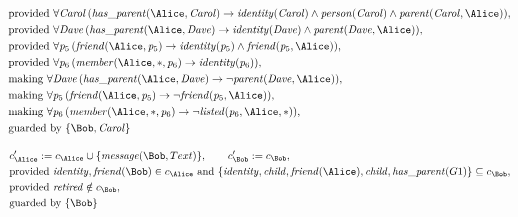 \begin{align*}
&
\text{provided } 
\forall 
\mathit{Carol}
\,(
\mathit{\detokenize{
has_parent
}}
(
\Alice
,
\mathit{Carol}
)
\rightarrow
\mathit{\detokenize{
identity
}}
(
\mathit{Carol}
)
\land
\mathit{\detokenize{
person
}}
(
\mathit{Carol}
)
\land
\mathit{\detokenize{
parent
}}
(
\mathit{Carol}
,
\Alice
)
)
,\\
&
\text{provided } 
\forall 
\mathit{Dave}
\,(
\mathit{\detokenize{
has_parent
}}
(
\Alice
,
\mathit{Dave}
)
\rightarrow
\mathit{\detokenize{
identity
}}
(
\mathit{Dave}
)
\land
\mathit{\detokenize{
parent
}}
(
\mathit{Dave}
,
\Alice
)
)
,\\
&
\text{provided } 
\forall 
\mathit{p}_{
5
}
\,(
\mathit{\detokenize{
friend
}}
(
\Alice
,
\mathit{p}_{
5
}
)
\rightarrow
\mathit{\detokenize{
identity
}}
(
\mathit{p}_{
5
}
)
\land
\mathit{\detokenize{
friend
}}
(
\mathit{p}_{
5
}
,
\Alice
)
)
,\\
&
\text{provided } 
\forall 
\mathit{p}_{
6
}
\,(
\mathit{\detokenize{
member
}}
(
\Alice
,
\ast
,
\mathit{p}_{
6
}
)
\rightarrow
\mathit{\detokenize{
identity
}}
(
\mathit{p}_{
6
}
)
)
,\\
&
\text{making } 
\forall 
\mathit{Dave}
\,(
\mathit{\detokenize{
has_parent
}}
(
\Alice
,
\mathit{Dave}
)
\rightarrow
\neg 
\mathit{\detokenize{
parent
}}
(
\mathit{Dave}
,
\Alice
)
)
,\\
&
\text{making } 
\forall 
\mathit{p}_{
5
}
\,(
\mathit{\detokenize{
friend
}}
(
\Alice
,
\mathit{p}_{
5
}
)
\rightarrow
\neg 
\mathit{\detokenize{
friend
}}
(
\mathit{p}_{
5
}
,
\Alice
)
)
,\\
&
\text{making } 
\forall 
\mathit{p}_{
6
}
\,(
\mathit{\detokenize{
member
}}
(
\Alice
,
\ast
,
\mathit{p}_{
6
}
)
\rightarrow
\neg 
\mathit{\detokenize{
listed
}}
(
\mathit{p}_{
6
}
,
\Alice
,
\ast
)
)
,\\
&
\text{guarded by } \{
\Bob
,
\mathit{Carol}
\}
\end{align*}

\begin{align*}
&
c'_
{
\Alice
}
 := 
c_
{
\Alice
}
 \cup 
\{
\mathit{\detokenize{
message
}}
(
\Bob
,
Text
)
\}
, \qquad 
c'_
{
\Bob
}
 := 
c_
{
\Bob
}
,\\
&
\text{provided } 
\mathit{\detokenize{
identity
}}
,
\mathit{\detokenize{
friend
}}
(
\Bob
)
 \in c_
{
\Alice
}
 \text{ and } 
\{
\mathit{\detokenize{
identity
}}
,
\mathit{\detokenize{
child
}}
,
\mathit{\detokenize{
friend
}}
(
\Alice
)
,
\mathit{\detokenize{
child
}}
,
\mathit{\detokenize{
has_parent
}}
(
G1
)
\}
 \subseteq c_
{
\Bob
}
,\\
&
\text{provided } 
\mathit{\detokenize{
retired
}}
 \notin c_
{
\Bob
}
,\\
&
\text{guarded by } \{
\Bob
\}
\end{align*}
